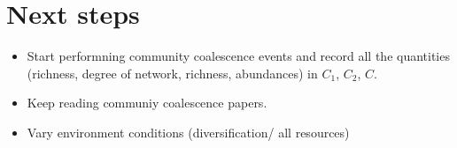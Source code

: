 \documentclass[10pt,letterpaper]{article}
\begin{document}
	\section*{Next steps}
		\begin{itemize}
			\item Start performning community coalescence events and record all the quantities (richness, degree of network, richness, abundances) in $ C_1 $, $ C_2 $, $ C $. 
			\item Keep reading communiy coalescence papers.
			\item Vary environment conditions (diversification/ all resources)\\
		\end{itemize}
	
		
		
\end{document}

